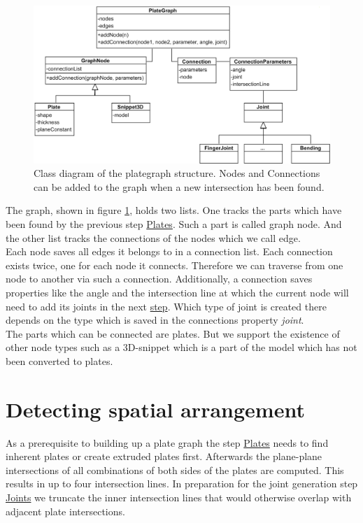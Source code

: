 \documentclass[../ClassicThesis.tex]{subfiles}
\begin{document}
\begin{figure}[!ht]
\centering
\includegraphics[width=1\columnwidth]{Images/GraphStructure.png}
\caption{Class diagram of the plategraph structure. Nodes and Connections can be added to the graph when a new intersection has been found.}
\label{fig:graphClassDiagram}
\end{figure}
The graph, shown in figure \ref{fig:graphClassDiagram}, holds two lists. One tracks the parts which have been found by the previous step \hyperref[ch:plates]{Plates}. Such a part is called graph node. And the other list tracks the connections of the nodes which we call edge. \\
Each node saves all edges it belongs to in a connection list. Each connection exists twice, one for each node it connects. Therefore we can traverse from one node to another via such a connection. Additionally, a connection saves properties like the angle and the intersection line at which the current node will need to add its joints in the next \hyperref[ch:joints]{step}. Which type of joint is created there depends on the type which is saved in the connections property \emph{joint}.\\
The parts which can be connected are plates. But we support the existence of other node types such as a 3D-snippet which is a part of the model which has not been converted to plates.

\section{Detecting spatial arrangement}
As a prerequisite to building up a plate graph the step \hyperref[ch:plates]{Plates} needs to find inherent plates or create extruded plates first. Afterwards the plane-plane intersections of all combinations of both sides of the plates are computed. This results in up to four intersection lines. In preparation for the joint generation step \hyperref[ch:joints]{Joints} we truncate the inner intersection lines that would otherwise overlap with adjacent plate intersections.
\end{document}
